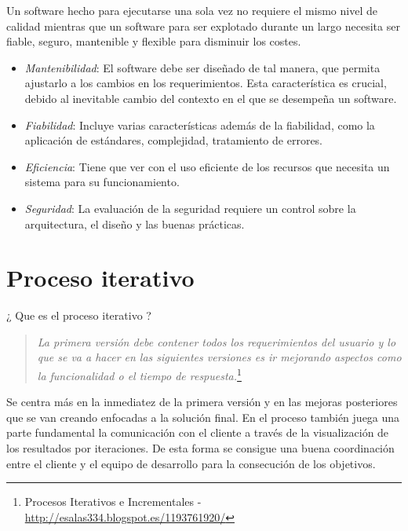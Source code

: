 \par Un software hecho para ejecutarse una sola vez no requiere el mismo nivel de calidad mientras que un software para ser explotado durante un largo necesita ser fiable, seguro, mantenible y flexible para disminuir los costes.

\begin{itemize}
	\item \emph{Mantenibilidad}: El software debe ser diseñado de tal manera, que permita ajustarlo a los cambios en los requerimientos. Esta característica es crucial, debido al inevitable cambio del contexto en el que se desempeña un software.
	\item \emph{Fiabilidad}: Incluye varias características además de la fiabilidad, como la aplicación de estándares, complejidad, tratamiento de errores.
	\item \emph{Eficiencia}: Tiene que ver con el uso eficiente de los recursos que necesita un sistema para su funcionamiento.
	\item \emph{Seguridad}: La evaluación de la seguridad requiere un control sobre la arquitectura, el diseño y las buenas prácticas.
\end{itemize}


\section{Proceso iterativo}
\label{sec:proc-iterativo}

\par ¿ Que es el proceso iterativo ?

\begin{quote}
    \emph{La primera versión debe contener todos los requerimientos del usuario y lo que se va a hacer en las siguientes versiones es ir mejorando aspectos como la funcionalidad o el tiempo de respuesta.}\footnote{Procesos Iterativos e Incrementales - \url{http://esalas334.blogspot.es/1193761920/}}
\end{quote}

\par Se centra más en la inmediatez de la primera versión y en las mejoras posteriores que se van creando enfocadas a la solución final. En el proceso también juega una parte fundamental la comunicación con el cliente a través de la visualización de los resultados por iteraciones. De esta forma se consigue una buena coordinación entre el cliente y el equipo de desarrollo para la consecución de los objetivos.

